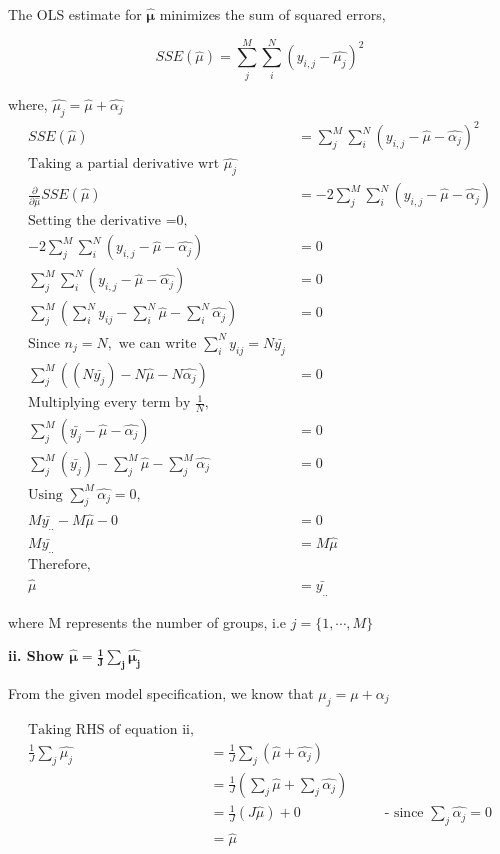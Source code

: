 \documentclass[12pt,]{article}
\begin{document}
The OLS estimate for \(\pmb{\hat{\mu}}\) minimizes the sum of squared
errors,

\[SSE(\hat{\mu})  = \sum_j^M\sum_i^N(y_{i,j} - \hat{\mu_j})^2\]

where, \(\hat{\mu_j} = \hat{\mu} + \hat{\alpha_j}\) \[
\begin{aligned}
SSE(\hat{\mu}) &= \sum_j^M \sum_i^N(y_{i,j} - \hat{\mu} - \hat{\alpha_j})^2 \\ 
\text{Taking a partial derivative wrt } \hat{\mu_j}\\ 
\frac{\partial}{\partial\hat{\mu}}SSE(\hat{\mu}) &= -2\sum_j^M \sum_i^N(y_{i,j} - \hat{\mu} - \hat{\alpha_j})\\
\text{Setting the derivative =0, }\\ 
-2\sum_j^M\sum_i^N(y_{i,j} - \hat{\mu} - \hat{\alpha_j}) &= 0\\
\sum_j^M\sum_i^N(y_{i,j} - \hat{\mu} - \hat{\alpha_j}) &= 0\\
\sum_j^M (\sum_i^Ny_{ij} -\sum_i^N\hat{\mu} - \sum_i^N\hat{\alpha_j}) &=0\\
\text{Since } n_j = N, \text{ we can write } \sum_i^Ny_{ij} = N\bar{y_j} \\
\sum_j^M((N\bar{y_j}) - N\hat{\mu} - N\hat{\alpha_j}) &= 0\\
\text{Multiplying every term by } \frac{1}{N},\\
\sum_j^M(\bar{y_j} - \hat{\mu} - \hat{\alpha_j}) &= 0\\
\sum_j^M(\bar{y_j}) - \sum_j^M\hat{\mu} - \sum_j^M\hat{\alpha_j} &= 0\\
\text{Using } \sum_j^M \hat{\alpha_j} = 0, \\
 M\bar{y_{..}} - M\hat{\mu} - 0 &= 0 \\
 M \bar{y_{..}} &= M\hat{\mu}\\
\text{Therefore, }\\
\hat{\mu} &= \bar{y_{..}}
\end{aligned}
\]

where M represents the number of groups, i.e \(j = \{1, \cdots, M\}\)

\textbf{ii. Show $\pmb{\hat{\mu} = \frac{1}{J}\sum_j\hat{\mu_j}}$}

From the given model specification, we know that
\(\mu_j = \mu + \alpha_j\)

\[
\begin{aligned}
\text{Taking RHS of equation ii, }\\
\frac{1}{J}\sum_j\hat{\mu_j} &= \frac{1}{J}\sum_j(\hat{\mu} + \hat{\alpha_j})\\
&= \frac{1}{J}(\sum_j\hat{\mu} + \sum_j\hat{\alpha_j})\\
&= \frac{1}{J}(J\hat{\mu}) + 0 \qquad \qquad \qquad \text{- since } \sum_j\hat{\alpha_j} = 0\\
&= \hat{\mu}
\end{aligned}
\]
\end{document}
